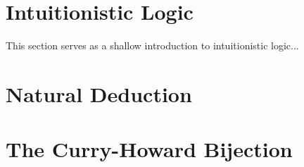 \section{\centering Intuitionistic Logic}
This section serves as a shallow introduction to intuitionistic logic...

\section{\centering Natural Deduction}

\section{\centering The Curry-Howard Bijection}



